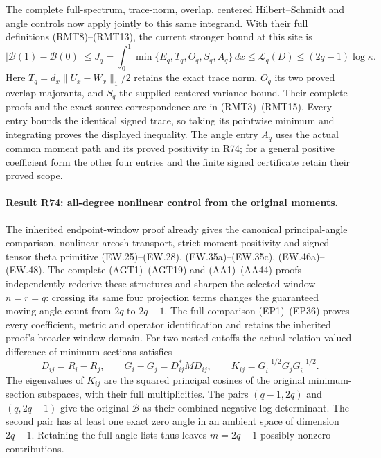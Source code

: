 The complete full-spectrum, trace-norm, overlap, centered
Hilbert--Schmidt and angle controls now apply jointly to
this same integrand.  With their full definitions
(RMT8)--(RMT13), the current stronger bound at this site is
\[
 |\mathcal B(1)-\mathcal B(0)|
 \leq J_q=\int_0^1\min\{E_q,T_q,O_q,S_q,A_q\}\,dx
 \leq\mathcal L_q(D)\leq(2q-1)\log\kappa .
\]
Here \(T_q=d_x\|U_x-W_x\|_1/2\) retains the exact trace
norm, \(O_q\) its two proved overlap majorants, and
\(S_q\) the supplied centered variance bound.  Their
complete proofs and the exact source correspondence are
in (RMT3)--(RMT15).  Every entry bounds the identical
signed trace, so taking its pointwise minimum and
integrating proves the displayed inequality.
The angle entry \(A_q\) uses the actual common moment
path and its proved positivity in R74; for a general
positive coefficient form the other four entries and
the finite signed certificate retain their proved scope.

\paragraph{Result R74: all-degree nonlinear control from the original moments.}
The inherited endpoint-window proof already gives the canonical
principal-angle comparison, nonlinear arcosh transport, strict
moment positivity and signed tensor theta primitive
(EW.25)--(EW.28), (EW.35a)--(EW.35c), (EW.46a)--(EW.48).
The complete (AGT1)--(AGT19) and (AA1)--(AA44) proofs independently
rederive these structures and sharpen the selected window $n=r=q$:
crossing its same four projection terms changes the guaranteed
moving-angle count from $2q$ to $2q-1$. The full comparison
(EP1)--(EP36) proves every coefficient, metric and operator
identification and retains the inherited proof's broader window
domain. For two nested cutoffs the actual relation-valued
difference of minimum sections satisfies
\[
D_{ij}=R_i-R_j,\qquad
G_i-G_j=D_{ij}^*MD_{ij},\qquad
K_{ij}=G_i^{-1/2}G_jG_i^{-1/2}.
\]
The eigenvalues of $K_{ij}$ are the squared principal
cosines of the original minimum-section subspaces, with
their full multiplicities. The pairs $(q-1,2q)$ and
$(q,2q-1)$ give the original $\mathcal B$ as their combined
negative log determinant. The second pair has at least
one exact zero angle in an ambient space of dimension
$2q-1$. Retaining the full angle lists thus leaves
$m=2q-1$ possibly nonzero contributions.

